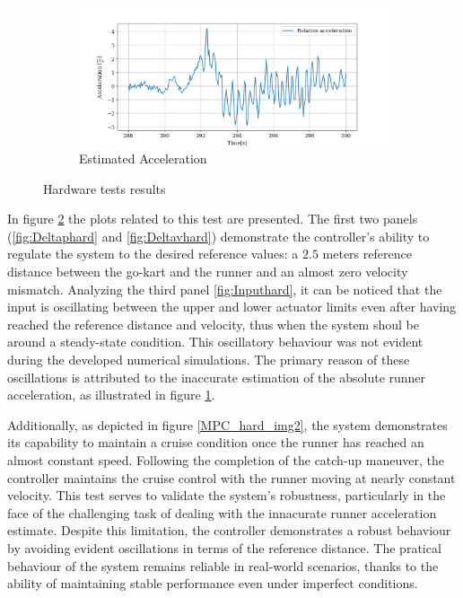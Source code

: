\documentclass[a4paper,12pt,oneside]{book}
\begin{document}
\begin{figure}
    \begin{subfigure}[t]{0.7\textwidth}
        \includegraphics[width=\textwidth]{Hardware_testMPC/Acceleration.png}
        \caption{Estimated Acceleration}
        \label{fig:Est_acc}
    \end{subfigure}
    \caption{Hardware tests results}
    \label{fig:Hardware_Test}
\end{figure}

\bigskip
In figure \ref{fig:Hardware_Test} the plots related to this test are presented.
The first two panels (\ref{fig:Deltaphard} and \ref{fig:Deltavhard}) demonstrate the controller's ability to regulate the system to the desired reference values: a $2.5$ meters reference distance between the go-kart and the runner and an almost zero velocity mismatch.
Analyzing the third panel \ref{fig:Inputhard}, it can be noticed that the input is oscillating between the upper and lower actuator limits even after having reached the reference distance and velocity, thus when the system shoul be around a steady-state condition.
This oscillatory behaviour was not evident during the developed numerical simulations.
The primary reason of these oscillations is attributed to the inaccurate estimation of the absolute runner acceleration, as illustrated in figure \ref{fig:Est_acc}.


\bigskip
Additionally, as depicted in figure \ref{MPC_hard_img2}, the system demonstrates its capability to maintain a cruise condition once the runner has reached an almost constant speed.
Following the completion of the catch-up maneuver, the controller maintains the cruise control with the runner moving at nearly constant velocity.
This test serves to validate the system's robustness, particularly in the face of the challenging task of dealing with the innacurate runner acceleration estimate.
Despite this limitation, the controller demonstrates a robust behaviour by avoiding evident oscillations in terms of the reference distance.
The pratical behaviour of the system remains reliable in real-world scenarios, thanks to the ability of maintaining stable performance even under imperfect conditions.
\end{document}
